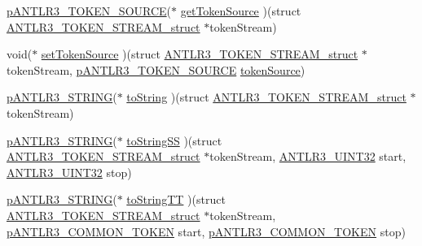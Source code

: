 \begin{DoxyCompactItemize}
\item 
\hyperlink{antlr3interfaces_8h_a4b8bc42f86b752cba4de49f0d1f53cba}{p\-A\-N\-T\-L\-R3\-\_\-\-T\-O\-K\-E\-N\-\_\-\-S\-O\-U\-R\-C\-E}($\ast$ \hyperlink{struct_a_n_t_l_r3___t_o_k_e_n___s_t_r_e_a_m__struct_acda0d0fe7a53f7f4276617f578ac74c2}{get\-Token\-Source} )(struct \hyperlink{struct_a_n_t_l_r3___t_o_k_e_n___s_t_r_e_a_m__struct}{A\-N\-T\-L\-R3\-\_\-\-T\-O\-K\-E\-N\-\_\-\-S\-T\-R\-E\-A\-M\-\_\-struct} $\ast$token\-Stream)
\item 
void($\ast$ \hyperlink{struct_a_n_t_l_r3___t_o_k_e_n___s_t_r_e_a_m__struct_ab03965c892e5e41ecbea0967570595d6}{set\-Token\-Source} )(struct \hyperlink{struct_a_n_t_l_r3___t_o_k_e_n___s_t_r_e_a_m__struct}{A\-N\-T\-L\-R3\-\_\-\-T\-O\-K\-E\-N\-\_\-\-S\-T\-R\-E\-A\-M\-\_\-struct} $\ast$token\-Stream, \hyperlink{antlr3interfaces_8h_a4b8bc42f86b752cba4de49f0d1f53cba}{p\-A\-N\-T\-L\-R3\-\_\-\-T\-O\-K\-E\-N\-\_\-\-S\-O\-U\-R\-C\-E} \hyperlink{struct_a_n_t_l_r3___t_o_k_e_n___s_t_r_e_a_m__struct_aa8a928aa966f26d92e8c25e0e369d319}{token\-Source})
\item 
\hyperlink{antlr3interfaces_8h_a36bbe7362079348864db4b4dbdcce56b}{p\-A\-N\-T\-L\-R3\-\_\-\-S\-T\-R\-I\-N\-G}($\ast$ \hyperlink{struct_a_n_t_l_r3___t_o_k_e_n___s_t_r_e_a_m__struct_a73ad539fad9cf718632287c611046949}{to\-String} )(struct \hyperlink{struct_a_n_t_l_r3___t_o_k_e_n___s_t_r_e_a_m__struct}{A\-N\-T\-L\-R3\-\_\-\-T\-O\-K\-E\-N\-\_\-\-S\-T\-R\-E\-A\-M\-\_\-struct} $\ast$token\-Stream)
\item 
\hyperlink{antlr3interfaces_8h_a36bbe7362079348864db4b4dbdcce56b}{p\-A\-N\-T\-L\-R3\-\_\-\-S\-T\-R\-I\-N\-G}($\ast$ \hyperlink{struct_a_n_t_l_r3___t_o_k_e_n___s_t_r_e_a_m__struct_a19753e062fae1bc059a380338b3aff10}{to\-String\-S\-S} )(struct \hyperlink{struct_a_n_t_l_r3___t_o_k_e_n___s_t_r_e_a_m__struct}{A\-N\-T\-L\-R3\-\_\-\-T\-O\-K\-E\-N\-\_\-\-S\-T\-R\-E\-A\-M\-\_\-struct} $\ast$token\-Stream, \hyperlink{antlr3defs_8h_ac41f744abd0fd25144b9eb9d11b1dfd1}{A\-N\-T\-L\-R3\-\_\-\-U\-I\-N\-T32} start, \hyperlink{antlr3defs_8h_ac41f744abd0fd25144b9eb9d11b1dfd1}{A\-N\-T\-L\-R3\-\_\-\-U\-I\-N\-T32} stop)
\item 
\hyperlink{antlr3interfaces_8h_a36bbe7362079348864db4b4dbdcce56b}{p\-A\-N\-T\-L\-R3\-\_\-\-S\-T\-R\-I\-N\-G}($\ast$ \hyperlink{struct_a_n_t_l_r3___t_o_k_e_n___s_t_r_e_a_m__struct_a527ad3a8a12fcadbe450119cf5ed9c8d}{to\-String\-T\-T} )(struct \hyperlink{struct_a_n_t_l_r3___t_o_k_e_n___s_t_r_e_a_m__struct}{A\-N\-T\-L\-R3\-\_\-\-T\-O\-K\-E\-N\-\_\-\-S\-T\-R\-E\-A\-M\-\_\-struct} $\ast$token\-Stream, \hyperlink{antlr3interfaces_8h_adaa6df9cbf0cd7ab37fd545520ff299b}{p\-A\-N\-T\-L\-R3\-\_\-\-C\-O\-M\-M\-O\-N\-\_\-\-T\-O\-K\-E\-N} start, \hyperlink{antlr3interfaces_8h_adaa6df9cbf0cd7ab37fd545520ff299b}{p\-A\-N\-T\-L\-R3\-\_\-\-C\-O\-M\-M\-O\-N\-\_\-\-T\-O\-K\-E\-N} stop)

\end{DoxyCompactItemize}

